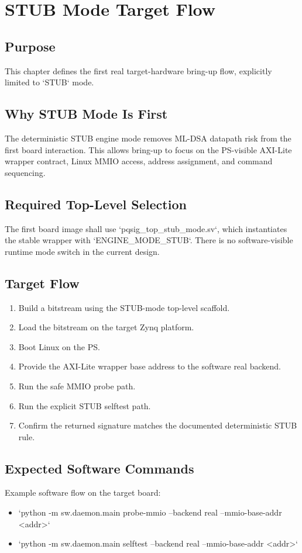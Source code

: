 \chapter{STUB Mode Target Flow}

\section*{Purpose}
This chapter defines the first real target-hardware bring-up flow, explicitly limited to `STUB` mode.

\section{Why STUB Mode Is First}
The deterministic STUB engine mode removes ML-DSA datapath risk from the first board interaction. This allows bring-up to focus on the PS-visible AXI-Lite wrapper contract, Linux MMIO access, address assignment, and command sequencing.

\section{Required Top-Level Selection}
The first board image shall use `pqsig\_top\_stub\_mode.sv`, which instantiates the stable wrapper with `ENGINE\_MODE\_STUB`. There is no software-visible runtime mode switch in the current design.

\section{Target Flow}
\begin{enumerate}[leftmargin=*]
  \item Build a bitstream using the STUB-mode top-level scaffold.
  \item Load the bitstream on the target Zynq platform.
  \item Boot Linux on the PS.
  \item Provide the AXI-Lite wrapper base address to the software real backend.
  \item Run the safe MMIO probe path.
  \item Run the explicit STUB selftest path.
  \item Confirm the returned signature matches the documented deterministic STUB rule.
\end{enumerate}

\section{Expected Software Commands}
Example software flow on the target board:
\begin{itemize}[leftmargin=*]
  \item `python -m sw.daemon.main probe-mmio --backend real --mmio-base-addr <addr>`
  \item `python -m sw.daemon.main selftest --backend real --mmio-base-addr <addr>`
\end{itemize}

